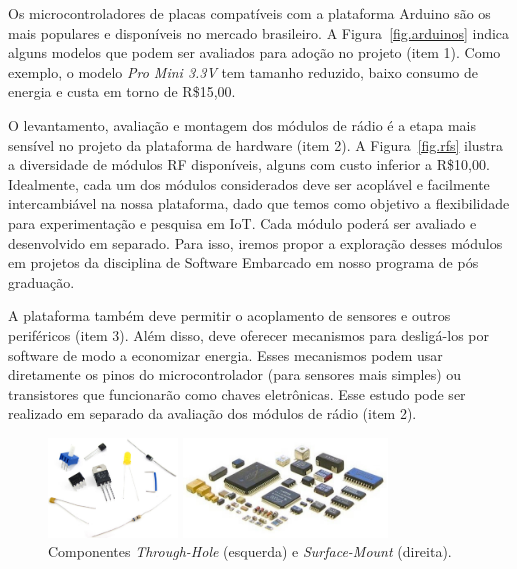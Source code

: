 \documentclass[titlepage,12pt]{article}
\begin{document}
Os microcontroladores de placas compatíveis com a plataforma Arduino são os
mais populares e disponíveis no mercado brasileiro.
%
A Figura~\ref{fig.arduinos} indica alguns modelos que podem ser avaliados para
adoção no projeto (item 1).
%
Como exemplo, o modelo \emph{Pro Mini 3.3V} tem tamanho reduzido, baixo consumo
de energia e custa em torno de R\$15,00.

O levantamento, avaliação e montagem dos módulos de rádio é a etapa mais
sensível no projeto da plataforma de hardware (item 2).
%
A Figura~\ref{fig.rfs} ilustra a diversidade de módulos RF disponíveis, alguns
com custo inferior a R\$10,00.
%
Idealmente, cada um dos módulos considerados deve ser acoplável e facilmente
intercambiável na nossa plataforma, dado que temos como objetivo a
flexibilidade para experimentação e pesquisa em IoT.
%
Cada módulo poderá ser avaliado e desenvolvido em separado.
Para isso, iremos propor a exploração desses módulos em projetos da disciplina
de Software Embarcado em nosso programa de pós graduação.


A plataforma também deve permitir o acoplamento de sensores e outros
periféricos (item 3).
%
Além disso, deve oferecer mecanismos para desligá-los por software de modo a
economizar energia.
%
Esses mecanismos podem usar diretamente os pinos do microcontrolador (para
sensores mais simples) ou transistores que funcionarão como chaves eletrônicas.
%
Esse estudo pode ser realizado em separado da avaliação dos módulos de rádio
(item 2).

\begin{figure}
\begin{minipage}{0.50\textwidth}
\includegraphics[height=100px]{through-hole}
\end{minipage}
\begin{minipage}{0.50\textwidth}
\includegraphics[height=100px]{smd}
\end{minipage}
\caption{ Componentes \emph{Through-Hole} (esquerda) e \emph{Surface-Mount} (direita).
    \label{fig.mount}
}
\end{figure}
\end{document}
